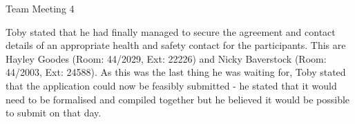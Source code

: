 \documentclass{article}
\begin{document}
\begin{Minutes}{Team Meeting 4}

Toby stated that he had finally managed to secure the agreement and contact details of an appropriate health and safety contact for the participants. This are Hayley Goodes (Room: 44/2029, Ext: 22226) and Nicky Baverstock (Room: 44/2003, Ext: 24588).
As this was the last thing he was waiting for, Toby stated that the application could now be feasibly submitted - he stated that it would need to be formalised and compiled together but he believed it would be possible to submit on that day.


\end{Minutes}
\end{document}

